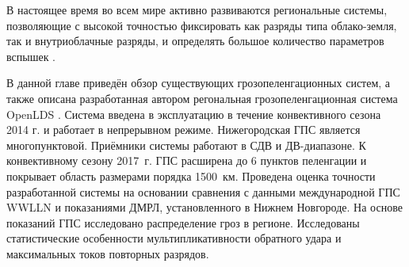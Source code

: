 В настоящее время во всем мире активно развиваются региональные системы, позволяющие с высокой точностью фиксировать как разряды типа облако-земля, так и внутриоблачные разряды, и определять большое количество параметров вспышек \cite{Pinto2003,nldnSiteArticle}.

В данной главе приведён обзор существующих грозопеленгационных систем, а также описана разработанная автором регональная грозопеленгационная система OpenLDS \cite{BulatovMiG}. Система введена в эксплуатацию в течение конвективного сезона 2014 г. и работает в непрерывном режиме. Нижегородская ГПС является многопунктовой. Приёмники системы  работают в СДВ и ДВ-диапазоне. К конвективному сезону 2017~г. ГПС расширена до 6 пунктов пеленгации и покрывает область размерами порядка 1500~км. Проведена оценка точности разработанной системы на основании сравнения с данными международной ГПС WWLLN и показаниями ДМРЛ, установленного в Нижнем Новгороде. На основе показаний ГПС исследовано распределение гроз в регионе. Исследованы статистические особенности мультипликативности обратного удара и максимальных токов повторных разрядов.

